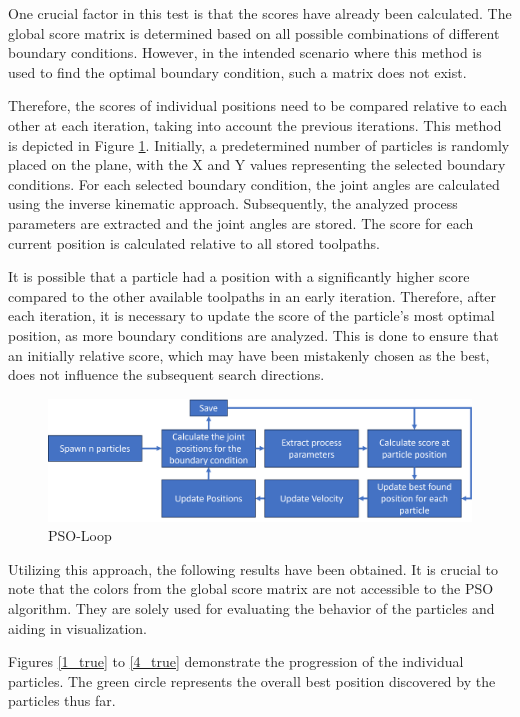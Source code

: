 One crucial factor in this test is that the scores have already been calculated. The global score matrix is determined based on all possible combinations of different boundary conditions. However, in the intended scenario where this method is used to find the optimal boundary condition, such a matrix does not exist.
\newpage

Therefore, the scores of individual positions need to be compared relative to each other at each iteration, taking into account the previous iterations. This method is depicted in Figure \ref{swarmloop}. Initially, a predetermined number of particles is randomly placed on the plane, with the X and Y values representing the selected boundary conditions. For each selected boundary condition, the joint angles are calculated using the inverse kinematic approach. Subsequently, the analyzed process parameters are extracted and the joint angles are stored. The score for each current position is calculated relative to all stored toolpaths.

It is possible that a particle had a position with a significantly higher score compared to the other available toolpaths in an early iteration. Therefore, after each iteration, it is necessary to update the score of the particle's most optimal position, as more boundary conditions are analyzed. This is done to ensure that an initially relative score, which may have been mistakenly chosen as the best, does not influence the subsequent search directions.

\begin{figure}[H]
	\centerline{\includegraphics[width=1\textwidth]{figures/swarmloop.png}}
	\caption{PSO-Loop}
	\label{swarmloop}
\end{figure}

Utilizing this approach, the following results have been obtained. It is crucial to note that the colors from the global score matrix are not accessible to the PSO algorithm. They are solely used for evaluating the behavior of the particles and aiding in visualization.

Figures \ref{1_true} to \ref{4_true} demonstrate the progression of the individual particles. The green circle represents the overall best position discovered by the particles thus far.

